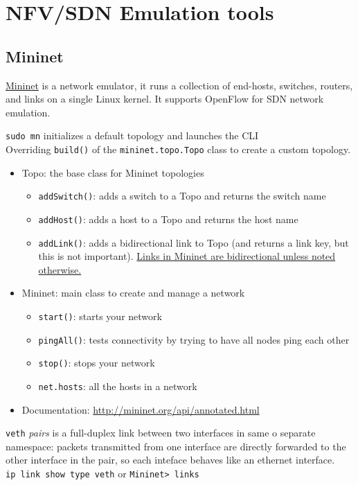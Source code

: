 \chapter{NFV/SDN Emulation tools}

\section{Mininet}
\href{http://mininet.org/}{Mininet} is a network emulator, it runs a collection of end-hosts, switches, routers, and links on a single Linux kernel.
It supports OpenFlow for SDN network emulation.


\lstinline|sudo mn| initializes a default topology and launches the CLI\\
Overriding \lstinline|build()| of the \lstinline|mininet.topo.Topo| class to create a custom topology.

\begin{itemize}
   \item Topo: the base class for Mininet topologies
   \begin{itemize}
      \item \lstinline|addSwitch()|: adds a switch to a Topo and returns the switch name
      \item \lstinline|addHost()|: adds a host to a Topo and returns the host name
      \item \lstinline|addLink()|: adds a bidirectional link to Topo (and returns a link key, but this is not important).
      \ul{Links in Mininet are bidirectional unless noted otherwise.}
   \end{itemize}
   \item Mininet: main class to create and manage a network
   \begin{itemize}
      \item \lstinline|start()|: starts your network
      \item \lstinline|pingAll()|: tests connectivity by trying to have all nodes ping each other
      \item \lstinline|stop()|: stops your network
      \item \lstinline|net.hosts|: all the hosts in a network
   \end{itemize}

   \item[] Documentation: \href{http://mininet.org/api/annotated.html}{http://mininet.org/api/annotated.html}
\end{itemize}

\lstinline|veth| \textit{pairs} is a full-duplex link between two interfaces in same o separate namespace:
packets transmitted from one interface are directly forwarded to the other interface in the pair, so each inteface behaves like an ethernet interface.\\
\lstinline|ip link show type veth| or \lstinline|Mininet> links|